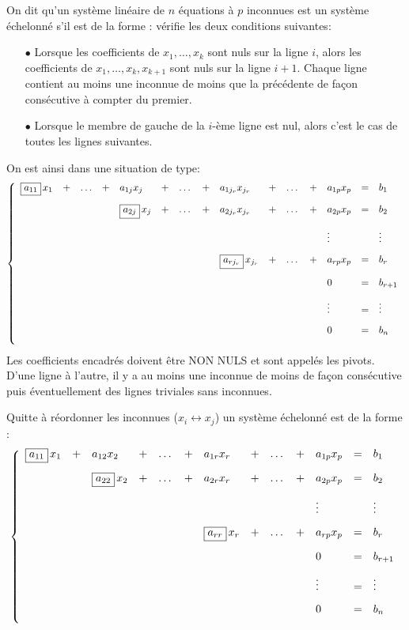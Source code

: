 \documentclass[a4paper, 11pt]{article}
\begin{document}
{\noindent  

\begin{defi} 
On dit qu'un syst\`eme lin\'eaire de $n$ \'equations \`a $p$ inconnues est un syst\`eme \'echelonn\'e s'il est de la forme :
v\'erifie les deux conditions suivantes:
\begin{itemize}
 \item[$\bullet$]
Lorsque les coefficients de $x_1,\dots, x_k$ sont nuls sur la ligne $i$, alors les coefficients de 
$x_1,\dots,x_k,x_{k+1}$ sont nuls sur la ligne $i+1$. Chaque ligne contient au moins une inconnue de moins que la pr\'ec\'edente de fa\c{c}on cons\'ecutive \`a compter du premier.
\item[$\bullet$] 
Lorsque le membre de gauche de la $i$-\`eme ligne est nul, alors c'est le cas de toutes les lignes suivantes.
\end{itemize}
On est ainsi dans une situation de type:
$$
\left\lbrace\begin{array}{lllllllllllllllll}
\fbox{$a_{11}$} \, x_1 & + & \ldots & + & a_{1j} x_j &+ & \dots & + & a_{1j_r}x_{j_r} &  + & \dots & + & a_{1p}x_p & = & b_1\vsec\\
 & & & & \fbox{$a_{2j}$} \, x_j & + & \dots & + & a_{2j_r}x_{j_r} & + & \dots & + & a_{2p}x_p & = & b_2\vsec\\
&&&&&&&& &&&&  \vdots &  &\vdots\vsec\\
&&&&&&&& \fbox{$a_{rj_r}$} \, x_{j_r} & + & \dots & + & a_{rp}x_p & = & b_r\vsec\\
&&&&&&&&&&&& 0 &= &b_{r+1}\vsec\\
&&&&&&&&&&&& \vdots &= &\vdots\vsec\\
&&&&&&&&&&&& 0 &= &b_{n}\vsec\\
\end{array}\right.
$$
Les coefficients encadr\'es doivent \^etre NON NULS et sont appel\'es les pivots.\\
\noindent D'une ligne \`a l'autre, il y a au moins une inconnue de moins de fa\c{c}on cons\'ecutive puis \'eventuellement des lignes triviales sans inconnues.
\end{defi}

}

Quitte à réordonner les inconnues ($x_i \leftrightarrow x_j$) un système échelonné est de la forme : 
$$
\left\lbrace\begin{array}{lllllllllllllll}
\fbox{$a_{11}$} \, x_1 &  + & a_{12} x_2 &+ & \dots & + & a_{1r}x_{r} &  + & \dots & + & a_{1p}x_p & = & b_1\vsec\\
  & & \fbox{$a_{22}$} \, x_2 & + & \dots & + & a_{2r}x_{r} & + & \dots & + & a_{2p}x_p & = & b_2\vsec\\
&&&&&& &&&&  \vdots &  &\vdots\vsec\\
&&&&&& \fbox{$a_{rr}$} \, x_{r} & + & \dots & + & a_{rp}x_p & = & b_r\vsec\\
&&&&&&&&&& 0 &= &b_{r+1}\vsec\\
&&&&&&&&&& \vdots &= &\vdots\vsec\\
&&&&&&&&&& 0 &= &b_{n}\vsec\\
\end{array}\right.
$$
\end{document}
